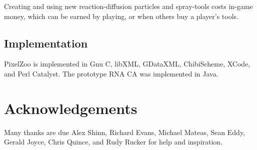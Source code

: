 \documentclass{acm_proc_article-sp}
\begin{document}
Creating and using new reaction-diffusion particles and spray-tools costs in-game money,
which can be earned by playing, or when others buy a player's tools.

\subsection{Implementation}

PixelZoo is implemented in Gnu C, libXML, GDataXML, ChibiScheme, XCode, and Perl Catalyst.
The prototype RNA CA was implemented in Java.

\section{Acknowledgements}

Many thanks are due Alex Shinn, Richard Evans, Michael Mateas, Sean Eddy, Gerald Joyce, Chris Quince,
and Rudy Rucker for help and inspiration.




\balancecolumns
\end{document}
